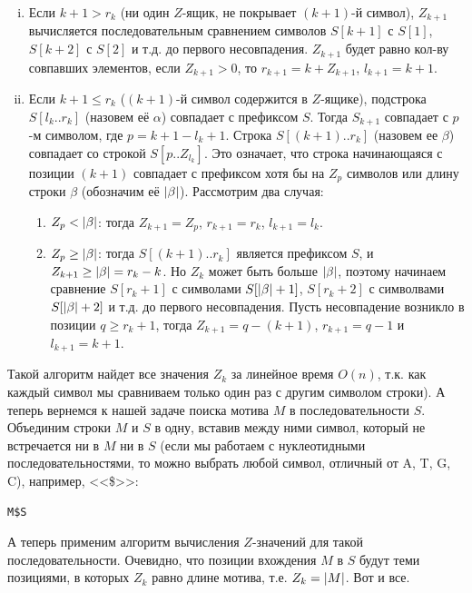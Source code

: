 \documentclass[letterpaper, 11pt]{article}
\DeclarePairedDelimiter{\abs}{\lvert}{\rvert}
\begin{document}
\begin{enumerate}[(i)]
\item
Если $k + 1 > r_k$ (ни один $Z$-ящик, не покрывает $(k+1)$-й символ), $Z_{k+1}$ вычисляется последовательным сравнением символов $S[k+1]$ с $S[1]$, $S[k+2]$ с $S[2]$ и т.д. до первого несовпадения. $Z_{k+1}$ будет равно кол-ву совпавших элементов, если $Z_{k+1} > 0$, то $r_{k+1} = k + Z_{k+1}$, $l_{k+1} = k + 1$.
\item
Если $k + 1 \leq r_k$ ($(k+1)$-й символ содержится в $Z$-ящике), подстрока $S[l_k..r_k]$ (назовем её $\alpha$) совпадает с префиксом $S$. Тогда $S_{k+1}$ совпадает с $p$-м символом, где $p = k + 1 - l_k + 1$. Строка $S[(k+1)..r_k]$ (назовем ее $\beta$) совпадает со строкой $S[p..Z_{l_k}]$. Это означает, что строка начинающаяся с позиции $(k+1)$ совпадает с префиксом хотя бы на $Z_{p}$ символов или длину строки $\beta$ (обозначим её $\abs{\beta}$). Рассмотрим два случая:
\begin{enumerate}
 \item
 $Z_{p} < \abs{\beta}$: тогда $Z_{k+1} = Z_{p}$, $r_{k+1} = r_{k}$, $l_{k+1} = l_k$.
 \item
 $Z_{p} \geq \abs{\beta}$: тогда $S[(k+1)..r_k]$ является префиксом $S$, и $Z_{k+1} \geq \abs{\beta} = r_k - k$. Но $Z_k$ может быть больше $\abs{\beta}$, поэтому начинаем сравнение $S[r_k + 1]$ с символами $S[\abs{\beta} + 1]$, $S[r_k + 2]$ с символвами $S[\abs{\beta} + 2]$ и т.д. до первого несовпадения. Пусть несовпадение возникло в позиции $q \geq r_k + 1$, тогда $Z_{k+1} = q - (k +1)$, $r_{k+1} = q - 1$ и $l_{k+1} = k + 1$.
\end{enumerate}
\end{enumerate}
\par
Такой алгоритм найдет все значения $Z_k$ за линейное время $O(n)$, т.к. как каждый символ мы сравниваем только один раз с другим символом строки). А теперь вернемся к нашей задаче поиска мотива $M$ в последовательности $S$. Объединим строки $M$ и $S$ в одну, вставив между ними символ, который не встречается ни в $M$ ни в $S$ (если мы работаем с нуклеотидными последовательностями, то можно выбрать любой символ, отличный от A, T, G, C), например, <<\$>>:
\begin{verbatim}
M$S
\end{verbatim}
\par
А теперь применим алгоритм вычисления $Z$-значений для такой последовательности. Очевидно, что позиции вхождения $M$ в $S$ будут теми позициями, в которых $Z_k$ равно длине мотива, т.е. $Z_k = \abs{M}$. Вот и все.
\end{document}
